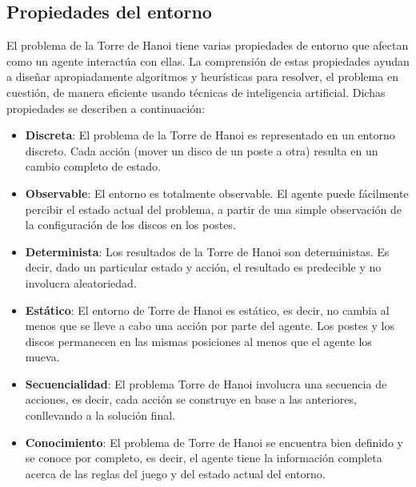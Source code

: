 \documentclass[a4paper,11pt]{article}
\begin{document}
\subsection{Propiedades del entorno}
El problema de la Torre de Hanoi tiene varias propiedades de entorno que afectan como un agente interactúa con ellas. La comprensión de estas propiedades ayudan a diseñar apropiadamente algoritmos y heurísticas para resolver, el problema en cuestión, de manera eficiente usando técnicas de inteligencia artificial. Dichas propiedades se describen a continuación:
\begin{itemize}
    \item \textbf{Discreta}: El problema de la Torre de Hanoi es representado en un entorno discreto. Cada acción (mover un disco de un poste a otra) resulta en un cambio completo de estado.
    \item \textbf{Observable}: El entorno es totalmente observable. El agente puede fácilmente percibir el estado actual del problema, a partir de una simple observación de la configuración de los discos en los postes.
    \item \textbf{Determinista}: Los resultados de la Torre de Hanoi son deterministas. Es decir, dado un particular estado y acción, el resultado es predecible y no involucra aleatoriedad.
    \item \textbf{Estático}: El entorno de Torre de Hanoi es estático, es decir, no cambia al menos que se lleve a cabo una acción por parte del agente. Los postes y los discos permanecen en las mismas posiciones al menos que el agente los mueva.
    \item \textbf{Secuencialidad}: El problema Torre de Hanoi involucra una secuencia de acciones, es decir, cada acción se construye en base a las anteriores, conllevando a la solución final.
    \item \textbf{Conocimiento}: El problema de Torre de Hanoi se encuentra bien definido y se conoce por completo, es decir, el agente tiene la información completa acerca de las reglas del juego y del estado actual del entorno.
\end{itemize}
\end{document}
